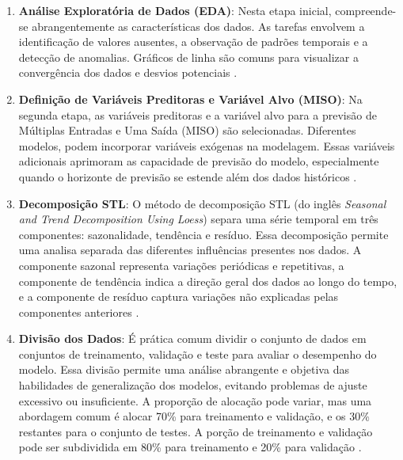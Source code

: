 \begin{enumerate}[start=1, label={\textbf{Etapa} \arabic*}]
	
	\item \label{etp:1} \textbf{Análise Exploratória de Dados (EDA)}: Nesta etapa inicial, compreende-se abrangentemente as características dos dados. As tarefas envolvem a identificação de valores ausentes, a observação de padrões temporais e a detecção de anomalias. Gráficos de linha são comuns para visualizar a convergência dos dados e desvios potenciais \cite{Rostam2021108249}.
	
	\item \label{etp:2} \textbf{Definição de Variáveis Preditoras e Variável Alvo (MISO)}: Na segunda etapa, as variáveis preditoras e a variável alvo para a previsão de Múltiplas Entradas e Uma Saída (MISO) são selecionadas. Diferentes modelos, podem incorporar variáveis exógenas na modelagem. Essas variáveis adicionais aprimoram as capacidade de previsão do modelo, especialmente quando o horizonte de previsão se estende além dos dados históricos \cite{PAWLOWSKI202298}. 
	
	\item \label{etp:3} \textbf{Decomposição STL}: O método de decomposição STL (do inglês \textit{Seasonal and Trend Decomposition Using Loess}) separa uma série temporal em três componentes: sazonalidade, tendência e resíduo. Essa decomposição permite uma analisa separada das diferentes influências presentes nos dados. A componente sazonal representa variações periódicas e repetitivas, a componente de tendência indica a direção geral dos dados ao longo do tempo, e a componente de resíduo captura variações não explicadas pelas componentes anteriores \cite{DEOLIVEIRA2018776}.
	
	\item \label{etp:4} \textbf{Divisão dos Dados}: É prática comum dividir o conjunto de dados em conjuntos de treinamento, validação e teste para avaliar o desempenho do modelo. Essa divisão permite uma análise abrangente e objetiva das habilidades de generalização dos modelos, evitando problemas de ajuste excessivo ou insuficiente. A proporção de alocação pode variar, mas uma abordagem comum é alocar 70\% para treinamento e validação, e os 30\% restantes para o conjunto de testes. A porção de treinamento e validação pode ser subdividida em 80\% para treinamento e 20\% para validação \cite{Tao2020}.
	

\end{enumerate}
